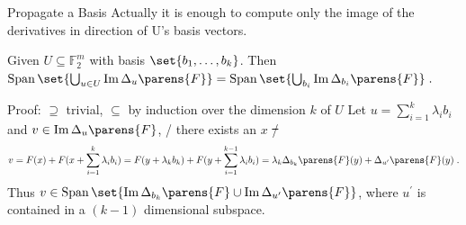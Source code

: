 \documentclass[%
    10pt,
    professionalfont,
    aspectratio=169,
    handout,
]{beamer}
\newcommand{\F}{\mathbb{F}}
\newcommand{\derive}[2]{\Delta_{#1}\parens{#2}}
\DeclareMathOperator{\ImOp}{Im}
\renewcommand{\Im}[1]{\ImOp {#1}}
\DeclareMathOperator{\SpanOp}{Span}
\newcommand{\Span}[1]{\SpanOp\set{#1}}
\begin{document}
\begin{frame}{Propagate a Basis}
    Actually it is enough to compute only the image of the derivatives in direction of U's basis vectors.
    \begin{lemma}
        Given $U \subseteq \F_2^m$ with basis $\set{b_1, \ldots, b_k}$.
        Then
        $
            \Span{\bigcup_{u \in U} \Im{\derive{u}{F}}} = \Span{\bigcup_{b_i} \Im{\derive{b_i}{F}}}\;.
        $
    \end{lemma}
    \pause
    \begin{block}{Proof: $\supseteq$ trivial, $\subseteq$ by induction over the dimension $k$ of $U$}
        Let $u = \sum_{i=1}^k \lambda_i b_i$ and $v \in \Im{\derive{u}{F}}$, \ie/ there exists an $x$ \st/
        \begin{equation*}
            v = F(x) + F(x + \sum_{i=1}^k \lambda_i b_i)
              = F(y + \lambda_k b_k) + F(y + \sum_{i=1}^{k-1} \lambda_i b_i)
              = \lambda_k \derive{b_k}{F}(y) + \derive{u^\prime}{F}(y)\;.
        \end{equation*}
        Thus $v \in \Span{\Im{\derive{b_k}{F}} \cup \Im{\derive{u^\prime}{F}}}$, where $u^\prime$ is contained in a $(k-1)$ dimensional subspace.\hfill\qedsymbol
    \end{block}
\end{frame}
\end{document}
